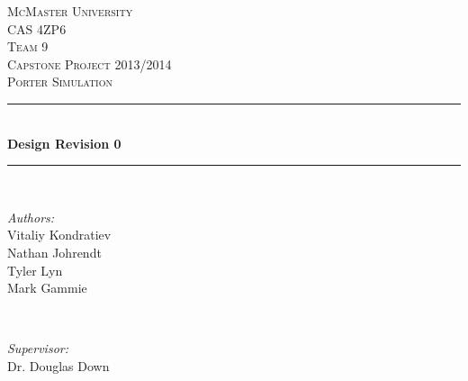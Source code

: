 \documentclass[paper=letter, fontsize=10pt]{scrartcl}
\numberwithin{equation}{section}		%
\numberwithin{figure}{section}			%
\numberwithin{table}{section}				%
\begin{document}
\begin{titlepage}

\newcommand{\HRule}{\rule{\linewidth}{0.5mm}} %
\newcommand{\authors}{\shortstack{Vitaliy Kondratiev,\\Nathan Johrendt,\\Tyler Lyn,\\Mark Gammie}}

\begin{center}
 

\textsc{\LARGE McMaster University}\\[1.5cm] %
\textsc{\Large CAS 4ZP6}\\[0.5cm]
\textsc{\Large Team 9} \\[0.5cm]
\textsc{\Large Capstone Project 2013/2014}\\[0.5cm] %
\textsc{\large Porter Simulation}\\[0.5cm] %


\HRule \\[0.4cm]
{ \huge \bfseries Design Revision 0}\\[0.4cm] %
\HRule \\[1.5cm]
 

\begin{minipage}{0.4\textwidth}
\begin{flushleft} \large
\emph{Authors:}\\
Vitaliy Kondratiev\\
Nathan Johrendt\\
Tyler Lyn\\
Mark Gammie
\end{flushleft}
\end{minipage}
~
\begin{minipage}{0.4\textwidth}
\begin{flushright} \large
\emph{Supervisor:} \\
Dr. Douglas Down %
\end{flushright}
\end{minipage}\\[4cm]


\end{center}
\end{titlepage}
\end{document}
